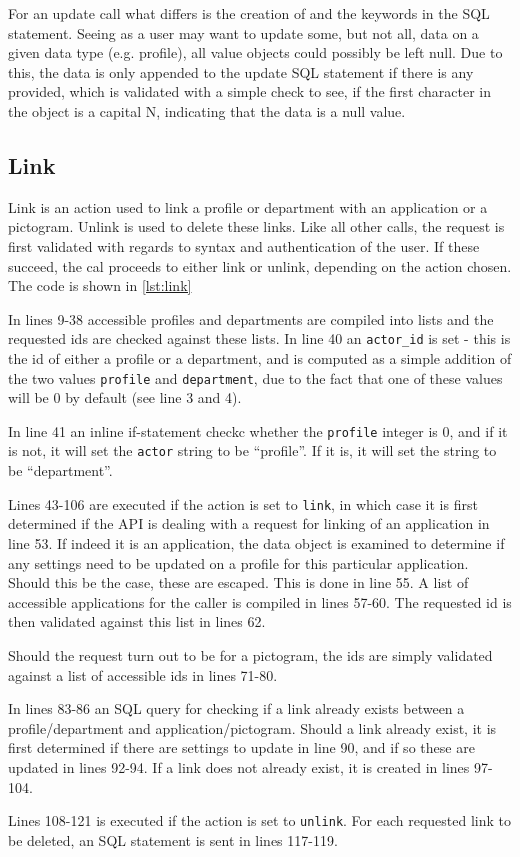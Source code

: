For an update call  what differs is the creation of and the keywords in the SQL statement. Seeing as a user may want to update some, but not all, data on a given data type (e.g. profile), all value objects could possibly be left null. Due to this, the data is only appended to the update SQL statement if there is any provided, which is validated with a simple check to see, if the first character in the object is a capital N, indicating that the data is a null value.

\subsection{Link}
Link is an action used to link a profile or department with an application or a pictogram. Unlink is used to delete these links. 
Like all other calls, the request is first validated with regards to syntax and authentication of the user. If these succeed, the cal proceeds to either link or unlink, depending on the action chosen. The code is shown in \autoref{lst:link}



In lines 9-38 accessible profiles and departments are compiled into lists and the requested ids are checked against these lists. In line 40 an \lstinline|actor_id| is set - this is the id of either a profile or a department, and is computed as a simple addition of the two values \lstinline|profile| and \lstinline|department|, due to the fact that one of these values will be 0 by default (see line 3 and 4). 

In line 41 an inline if-statement checkc whether the \lstinline|profile| integer is 0, and if it is not, it will set the \lstinline|actor| string to be ``profile''. If it is, it will set the string to be ``department''. 

Lines 43-106 are executed if the action is set to \lstinline|link|, in which case it is first determined if the API is dealing with a request for linking of an application in line 53. If indeed it is an application, the data object is examined to determine if any settings need to be updated on a profile for this particular application. Should this be the case, these are escaped. This is done in line 55. A list of accessible applications for the caller is compiled in lines 57-60. The requested id is then validated against this list in lines 62.

Should the request turn out to be for a pictogram, the ids are simply validated against a list of accessible ids in lines 71-80. 

In lines 83-86 an SQL query for checking if a link already exists between a profile/department and application/pictogram. Should a link already exist, it is first determined if there are settings to update in line 90, and if so these are updated in lines 92-94. If a link does not already exist, it is created in lines 97-104.

Lines 108-121 is executed if the action is set to \lstinline|unlink|. For each requested link to be deleted, an SQL statement is sent in lines 117-119.